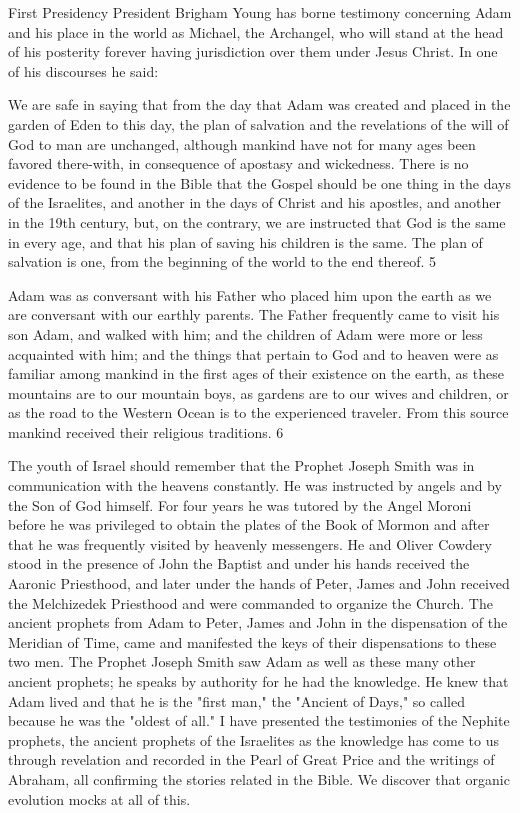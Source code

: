 First Presidency President Brigham Young has borne testimony concerning Adam and his
place in the world as Michael, the Archangel, who will stand at the head of his posterity
forever having jurisdiction over them under Jesus Christ. In one of his discourses he said:

We are safe in saying that from the day that Adam was created and placed in the garden of
Eden to this day, the plan of salvation and the revelations of the will of God to man are
unchanged, although mankind have not for many ages been favored there-with, in
consequence of apostasy and wickedness. There is no evidence to be found in the Bible that
the Gospel should be one thing in the days of the Israelites, and another in the days of Christ
and his apostles, and another in the 19th century, but, on the contrary, we are instructed that
God is the same in every age, and that his plan of saving his children is the same. The plan of
salvation is one, from the beginning of the world to the end thereof. 5

Adam was as conversant with his Father who placed him upon the earth as we are conversant
with our earthly parents. The Father frequently came to visit his son Adam, and walked with
him; and the children of Adam were more or less acquainted with him; and the things that
pertain to God and to heaven were as familiar among mankind in the first ages of their
existence on the earth, as these mountains are to our mountain boys, as gardens are to our
wives and children, or as the road to the Western Ocean is to the experienced traveler. From
this source mankind received their religious traditions. 6

The youth of Israel should remember that the Prophet Joseph Smith was in communication
with the heavens constantly. He was instructed by angels and by the Son of God himself. For
four years he was tutored by the Angel Moroni before he was privileged to obtain the plates
of the Book of Mormon and after that he was frequently visited by heavenly messengers. He
and Oliver Cowdery stood in the presence of John the Baptist and under his hands received
the Aaronic Priesthood, and later under the hands of Peter, James and John received the
Melchizedek Priesthood and were commanded to organize the Church. The ancient prophets
from Adam to Peter, James and John in the dispensation of the Meridian of Time, came and
manifested the keys of their dispensations to these two men. The Prophet Joseph Smith saw
Adam as well as these many other ancient prophets; he speaks by authority for he had the
knowledge. He knew that Adam lived and that he is the "first man," the "Ancient of Days,"
so called because he was the "oldest of all." I have presented the testimonies of the Nephite
prophets, the ancient prophets of the Israelites as the knowledge has come to us through
revelation and recorded in the Pearl of Great Price and the writings of Abraham, all
confirming the stories related in the Bible. We discover that organic evolution mocks at all of
this.

